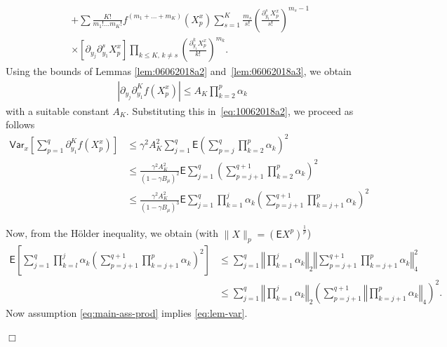 \documentclass[bj]{imsart}
\newcommand{\proofendsign}{$\Box$}
\newenvironment{proof}{{\noindent \bf Proof }}
 {{\hspace*{\fill}\proofendsign\par\bigskip}}
\begin{document}
\begin{proof}
\begin{eqnarray*}
&&+\sum\frac{K!}{m_{1}!\ldots m_{K}!}f^{(m_{1}+\ldots+m_{K})}(X^x_{p})
\sum_{s=1}^{K}\frac{m_{s}}{s!}
\left(\frac{\partial_{y_{1}}^{s}X^x_{p}}{s!}\right)^{m_{s}-1}
\\
&& \times\left[\partial_{y_{j}}\partial_{y_{1}}^{s}X^x_{p}\right]
\prod_{k\le K,\,k\neq s}\left(\frac{\partial_{y_{1}}^{k}X^x_{p}}{k!}\right)^{m_{k}}.
\end{eqnarray*}
Using the bounds of
Lemmas \ref{lem:06062018a2} and~\ref{lem:06062018a3},
we obtain
\begin{eqnarray}
\label{eq:part-part}
\left|\partial_{y_{j}}\partial_{y_{1}}^{K}f\left(X_{p}^x\right)\right|
\leq A_{K}\prod_{k=2}^{p}\alpha_{k}
\end{eqnarray}
with a suitable constant $A_{K}$.
Substituting this in~\eqref{eq:10062018a2},
we proceed as follows
\begin{align*}
\mathsf{Var}_x\left[\sum_{p=1}^{q}\partial_{y_{1}}^{K}f\left(X_{p}^x\right)\right]
&\le
\gamma^2 A_{K}^{2}\sum_{j=1}^{q}
\mathsf{E}\left(\sum_{p=j}^{q}\prod_{k=2}^{p}\alpha_{k}\right)^{2}
\\
&\le
\frac{\gamma^2 A_{K}^{2}}{(1-\gamma B_\mu)^2}
\mathsf{E}\sum_{j=1}^{q}
\left(\sum_{p=j+1}^{q+1}  \prod_{k=2}^{p} \alpha_{k}
\right)^{2}
\\
&\le
\frac{\gamma^2 A_{K}^{2}}{(1-\gamma B_\mu)^3}
\mathsf{E}\sum_{j=1}^{q}
\prod_{k=1}^{j} \alpha_{k}
\left(\sum_{p=j+1}^{q+1}  \prod_{k=j+1}^{p} \alpha_{k}
\right)^{2}
\end{align*}

Now, from the H\"older inequality, we obtain (with $\|X\|_p = (\mathsf{E}X^p)^{\frac{1}{p}}$)
\begin{align*}
\mathsf{E}\left[\sum_{j=1}^{q}\prod_{k=l}^{j}\alpha_{k}\left( \sum_{p=j+1}^{q+1}\prod_{k=j+1}^{p}\alpha_{k}\right)^{2}\right] & \leq\sum_{j=1}^{q}\left\Vert \prod_{k=1}^{j}\alpha_{k}\right\Vert _{2}\left\Vert \sum_{p=j+1}^{q+1} \prod_{k=j+1}^{p}\alpha_{k}\right\Vert _{4}^{2}\\
 & \leq\sum_{j=1}^{q} \left\Vert \prod_{k=1}^{j}\alpha_{k}\right\Vert _{2}\left(\sum_{p=j+1}^{q+1}\left\Vert \prod_{k=j+1}^{p}\alpha_{k}\right\Vert _{4}\right)^{2}.
\end{align*}
Now assumption \eqref{eq:main-ass-prod} implies \eqref{eq:lem-var}.
\end{proof}
\end{document}
